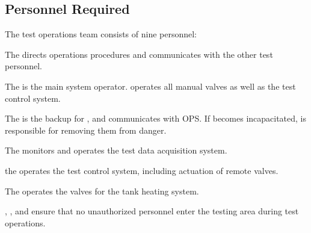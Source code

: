 \subsection{Personnel Required}
The test operations team consists of nine personnel:
\begin{checklist}
    \item The \opsfull{} directs operations procedures and communicates with the other test personnel.
    \item The \primaryfull{} is the main system operator. \primary{} operates all manual valves as well as the test control system.
    \item The \secondaryfull{} is the backup for \primary{}, and communicates with OPS. If \primary{} becomes incapacitated, \secondary{} is responsible for removing them from danger.
    \item The \daqfull{} monitors and operates the test data acquisition system.
    \item the \controlfull{} operates the test control system, including actuation of remote valves.
    \item The \heatfull{} operates the valves for the tank heating system.
    \item \perifull{}, \periifull{}, and \periiifull{} ensure that no unauthorized personnel enter the testing area during test operations.
\end{checklist}
\setcounter{checklistnum}{0}

